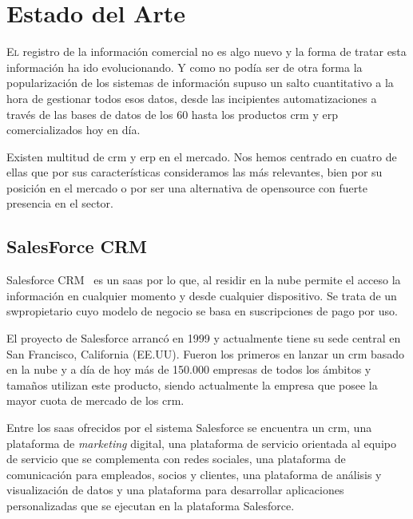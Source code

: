  \chapter{Estado del Arte}
\label{chap:estado-arte}

\lettrine{E}{l} registro de la información comercial no es algo nuevo y la forma de tratar esta información ha ido evolucionando. Y como no podía ser de otra forma la popularización de los sistemas de información supuso un salto cuantitativo a la hora de gestionar todos esos datos, desde las incipientes automatizaciones a través de las bases de datos de los 60 hasta los productos \acrshort{crm} y \acrshort{erp} comercializados hoy en día.

Existen multitud de \acrshort{crm} y \acrshort{erp} en el mercado. Nos hemos centrado en cuatro de ellas que por sus características consideramos las más relevantes, bien por su posición en el mercado o por ser una alternativa de \gls{opensource} con fuerte presencia en el sector.



\section{SalesForce CRM}
\label{sec:estado-arte-salesforce}

Salesforce CRM~\cite{SalesforceCRM} es un \acrfull{saas} por lo que, al residir en la nube permite el acceso la información en cualquier momento y desde cualquier dispositivo. Se trata de un \gls{swpropietario} cuyo modelo de negocio se basa en suscripciones de pago por uso.

El proyecto de Salesforce arrancó en 1999 y actualmente tiene su sede central en San Francisco, California (EE.UU). Fueron los primeros en lanzar un \acrshort{crm} basado en la nube y a día de hoy más de 150.000 empresas de todos los ámbitos y tamaños utilizan este producto, siendo actualmente la empresa que posee la mayor cuota de mercado de los \acrshort{crm}. \newline

Entre los \acrshort{saas} ofrecidos por el sistema Salesforce se encuentra un \acrshort{crm}, una plataforma de \emph{marketing} digital, una plataforma de servicio orientada al equipo de servicio que se complementa con redes sociales, una plataforma de comunicación para empleados, socios y clientes, una plataforma de análisis y visualización de datos y una plataforma para desarrollar aplicaciones personalizadas que se ejecutan en la plataforma Salesforce.

